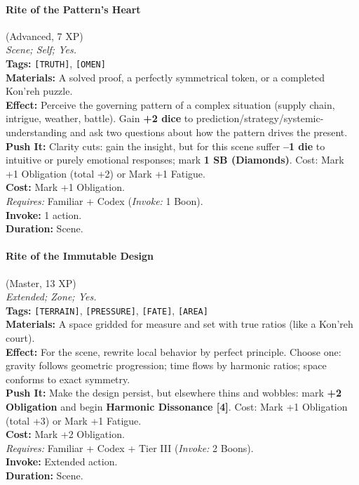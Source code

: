 \paragraph{Rite of the Pattern's Heart} (Advanced, 7 XP) \hfill \\
\emph{Scene; Self; Yes.} \\
\textbf{Tags:} \texttt{[TRUTH]}, \texttt{[OMEN]} \\
\textbf{Materials:} A solved proof, a perfectly symmetrical token, or a completed Kon'reh puzzle. \\
\textbf{Effect:} Perceive the governing pattern of a complex situation (supply chain, intrigue, weather, battle). Gain \textbf{+2 dice} to prediction/strategy/systemic-understanding and ask two questions about how the pattern drives the present. \\
\textbf{Push It:} Clarity cuts: gain the insight, but for this scene suffer \textbf{--1 die} to intuitive or purely emotional responses; mark \textbf{1 SB (Diamonds)}. Cost: Mark +1 Obligation (total +2) or Mark +1 Fatigue. \\
\textbf{Cost:} Mark +1 Obligation. \\
\textit{Requires:} Familiar + Codex (\textit{Invoke:} 1 Boon). \\
\textbf{Invoke:} 1 action. \\
\textbf{Duration:} Scene.

\paragraph{Rite of the Immutable Design} (Master, 13 XP) \hfill \\
\emph{Extended; Zone; Yes.} \\
\textbf{Tags:} \texttt{[TERRAIN]}, \texttt{[PRESSURE]}, \texttt{[FATE]}, \texttt{[AREA]} \\
\textbf{Materials:} A space gridded for measure and set with true ratios (like a Kon'reh court). \\
\textbf{Effect:} For the scene, rewrite local behavior by perfect principle. Choose one: gravity follows geometric progression; time flows by harmonic ratios; space conforms to exact symmetry. \\
\textbf{Push It:} Make the design persist, but elsewhere thins and wobbles: mark \textbf{+2 Obligation} and begin \textbf{Harmonic Dissonance [4]}. Cost: Mark +1 Obligation (total +3) or Mark +1 Fatigue. \\
\textbf{Cost:} Mark +2 Obligation. \\
\textit{Requires:} Familiar + Codex + Tier III (\textit{Invoke:} 2 Boons). \\
\textbf{Invoke:} Extended action. \\
\textbf{Duration:} Scene.

